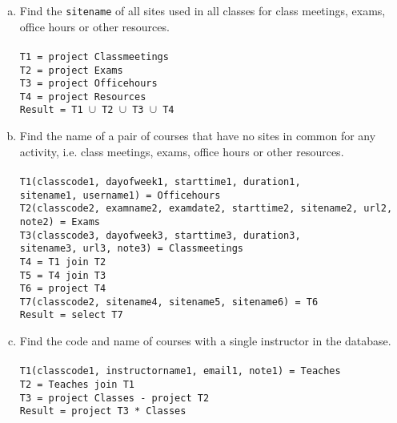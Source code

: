 \documentclass[11pt]{article}
\begin{document}
\begin{enumerate}  [(a)]
\item Find the {\tt sitename} of all sites used in all classes for
  class meetings, exams, office hours or other resources.\\\\
\texttt{T1 = project Classmeetings} \\
\texttt{T2 = project Exams} \\
\texttt{T3 = project Officehours} \\
\texttt{T4 = project Resources} \\
\texttt{Result = T1 $\cup$ T2 $\cup$ T3 $\cup$ T4}


\item Find the name of a pair of courses that have no sites in common
  for any activity, i.e. class meetings, exams, office hours or other
  resources. \\\\
 \texttt{T1(classcode1, dayofweek1, starttime1, duration1, \\sitename1, username1) = Officehours} \\
 \texttt{T2(classcode2, examname2, examdate2, starttime2, sitename2, url2, note2) = Exams} \\
 \texttt{T3(classcode3, dayofweek3, starttime3, duration3, \\sitename3, url3, note3) = Classmeetings} \\
 \texttt{T4 = T1 join T2}  \\
 \texttt{T5 = T4 join T3}  \\
 \texttt{T6 = project T4} \\
 \texttt{T7(classcode2, sitename4, sitename5, sitename6) = T6} \\ 
 \texttt{Result = select T7}
 
\item Find the code and name of courses with a single instructor in
  the database. \\\\
\texttt{T1(classcode1, instructorname1, email1, note1) = Teaches} \\
\texttt{T2 = Teaches join T1} \\
\texttt{T3 = project Classes  - project T2} \\
\texttt{Result = project T3 * Classes } \\


\end{enumerate}
\end{document}
